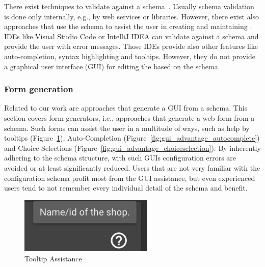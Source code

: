 There exist techniques to validate \cfgfiles{} against a schema~\cite{JSON_schema_vailidation,JSONValidation,baeldung_2023}.
Usually schema validation is done only internally, e.g., by web services or libraries.
However, there exist also approaches that use the schema to assist the user in creating and maintaining \cfgfiles.
IDEs like Visual Studio Code or IntelliJ IDEA can validate \cfgfiles{} against a schema and provide the user with error messages.
Those IDEs provide also other features like auto-completion, syntax highlighting and tooltips.
However, they do not provide a graphical user interface (GUI) for editing the \cfgfiles{} based on the schema.


\subsubsection{Form generation}\label{subsubsec:schema-to-gui}

Related to our work are approaches that generate a GUI from a schema.
This section covers form generators, i.e., approaches that generate a web form from a schema.
Such forms can assist the user in a multitude of ways, such as help by tooltips (Figure~\ref{fig:gui_advantage_tooltip}), Auto-Completion (Figure~\ref{fig:gui_advantage_autocomplete}) and Choice Selections (Figure~\ref{fig:gui_advantage_choiceselection}).
By inherently adhering to the schema structure, with such GUIs configuration errors are avoided or at least significantly reduced.
Users that are not very familiar with the configuration schema profit most from the GUI assistance, but even experienced users tend to not remember every individual detail of the schema and benefit.

\begin{figure}[!t]
\centering
\includegraphics[width=2.5in]{figures/gui_advantage_tooltip}
\caption{Tooltip Assistance}
\label{fig:gui_advantage_tooltip}
\end{figure}

